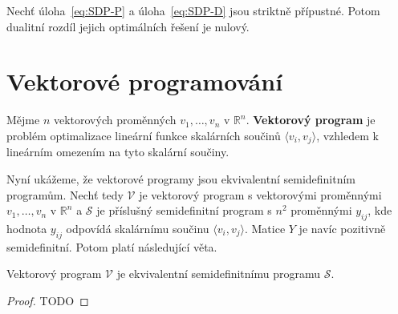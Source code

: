 \begin{vt2}
    Nechť úloha~\ref{eq:SDP-P} a úloha~\ref{eq:SDP-D} jsou striktně přípustné. Potom dualitní rozdíl jejich optimálních řešení je nulový.
\end{vt2}


\section{Vektorové programování}

Mějme $n$ vektorových proměnných $v_1, \dots, v_n$ v $\mathbb{R}^n$. \textbf{Vektorový program} je problém optimalizace lineární funkce skalárních součinů $\langle v_i, v_j \rangle$, vzhledem k lineárním omezením na tyto skalární součiny.

Nyní ukážeme, že vektorové programy jsou ekvivalentní semidefinitním programům. Nechť tedy $\mathcal{V}$ je vektorový program s vektorovými proměnnými $v_1, \dots, v_n$ v $\mathbb{R}^n$ a $\mathcal{S}$ je příslušný semidefinitní program s $n^2$ proměnnými $y_{ij}$, kde hodnota $y_{ij}$ odpovídá skalárnímu součinu $\langle v_i, v_j \rangle$. Matice $Y$ je navíc pozitivně semidefinitní. Potom platí následující věta.

\begin{vt2}
    Vektorový program $\mathcal{V}$ je ekvivalentní semidefinitnímu programu $\mathcal{S}$.
\end{vt2}

\begin{proof}
    TODO
\end{proof}


% 
% 
% 
% 
% 
% 
% 


